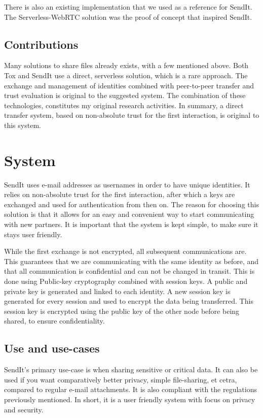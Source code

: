 \documentclass[letterpaper, 10 pt, conference]{ieeeconf}  %
\begin{document}
There is also an existing implementation that we used as a reference for SendIt. The Serverless-WebRTC solution \cite{url_webrtc_ex} was the proof of concept that inspired SendIt.
%
\subsection{Contributions}
Many solutions to share files already exists, with a few mentioned above. Both Tox and SendIt use a direct, serverless solution, which is a rare approach. The exchange and management of identities combined with peer-to-peer transfer and trust evaluation is original to the suggested system. The combination of these technologies, constitutes my original research activities. In summary, a direct transfer system, based on non-absolute trust for the first interaction, is original to this system.
%
\section{System}
%
SendIt uses e-mail addresses as usernames in order to have unique identities. It relies on non-absolute trust for the first interaction, after which a keys are exchanged and used for authentication from then on. The reason for choosing this solution is that it allows for an easy and convenient way to start communicating with new partners. It is important that the system is kept simple, to make sure it stays user friendly.

While the first exchange is not encrypted, all subsequent communications are. This guarantees that we are communicating with the same identity as before, and that all communication is confidential and can not be changed in transit. This is done using Public-key cryptography combined with session keys. A public and private key is generated and linked to each identity. A new session key is generated for every session and used to encrypt the data being transferred. This session key is encrypted using the public key of the other node before being shared, to ensure confidentiality.

\subsection{Use and use-cases}
SendIt's primary use-case is when sharing sensitive or critical data. It can also be used if you want comparatively better privacy, simple file-sharing, et cetra, compared to regular e-mail attachments. It is also compliant with the regulations previously mentioned. In short, it is a user friendly system with focus on privacy and security.
\end{document}
